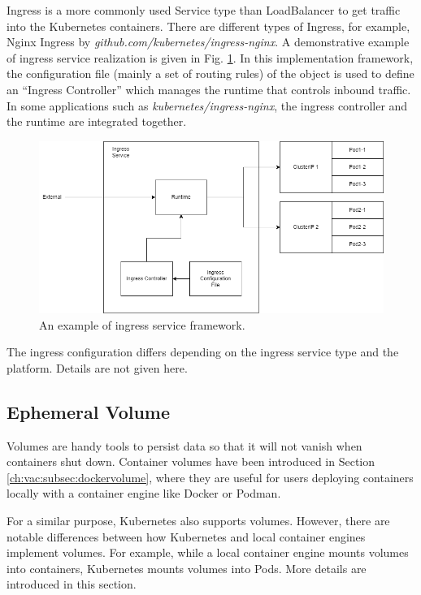Ingress is a more commonly used Service type than LoadBalancer to get traffic into the Kubernetes containers. There are different types of Ingress, for example, Nginx Ingress by \textit{github.com/kubernetes/ingress-nginx}. A demonstrative example of ingress service realization is given in Fig. \ref{ch:vac:fig:ingress_service}. In this implementation framework, the configuration file (mainly a set of routing rules) of the object is used to define an ``Ingress Controller'' which manages the runtime that controls inbound traffic. In some applications such as \textit{kubernetes/ingress-nginx}, the ingress controller and the runtime are integrated together.

\begin{figure}[htbp]
	\centering
	\includegraphics[width=350pt]{chapters/part-3/figures/ingress_service.png}
	\caption{An example of ingress service framework.} \label{ch:vac:fig:ingress_service}
\end{figure}

The ingress configuration differs depending on the ingress service type and the platform. Details are not given here.

\subsection{Ephemeral Volume}

Volumes are handy tools to persist data so that it will not vanish when containers shut down. Container volumes have been introduced in Section \ref{ch:vac:subsec:dockervolume}, where they are useful for users deploying containers locally with a container engine like Docker or Podman.

For a similar purpose, Kubernetes also supports volumes. However, there are notable differences between how Kubernetes and local container engines implement volumes. For example, while a local container engine mounts volumes into containers, Kubernetes mounts volumes into Pods. More details are introduced in this section.

